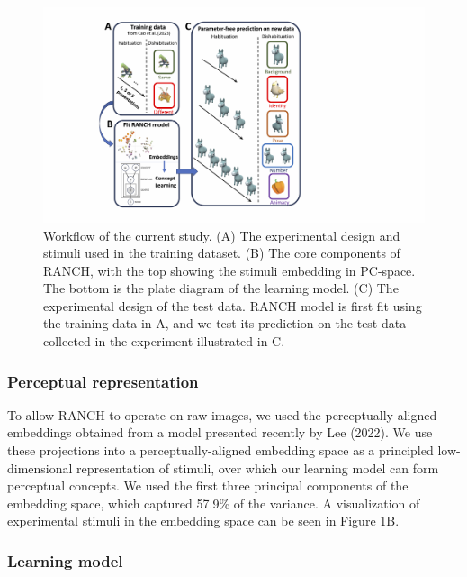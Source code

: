 \documentclass[10pt, letterpaper]{article}
\newenvironment{CodeChunk}{}{}
\begin{document}
\begin{CodeChunk}
\begin{figure}[h!]

{\centering \includegraphics{figs/design_fig-1} 

}

\caption[Workflow of the current study]{Workflow of the current study. (A) The experimental design and stimuli used in the training dataset. (B) The core components of RANCH, with the top showing the stimuli embedding in PC-space. The bottom is the plate diagram of the learning model. (C) The experimental design of the test data. RANCH model is first fit using the training data in A, and we test its prediction on the test data collected in the experiment illustrated in C.}\label{fig:design_fig}
\end{figure}
\end{CodeChunk}

\hypertarget{perceptual-representation}{%
\subsubsection{Perceptual
representation}\label{perceptual-representation}}

To allow RANCH to operate on raw images, we used the
perceptually-aligned embeddings obtained from a model presented recently
by Lee (2022). We use these projections into a perceptually-aligned
embedding space as a principled low-dimensional representation of
stimuli, over which our learning model can form perceptual concepts. We
used the first three principal components of the embedding space, which
captured 57.9\% of the variance. A visualization of experimental stimuli
in the embedding space can be seen in Figure 1B.

\hypertarget{learning-model}{%
\subsubsection{Learning model}\label{learning-model}}
\end{document}

